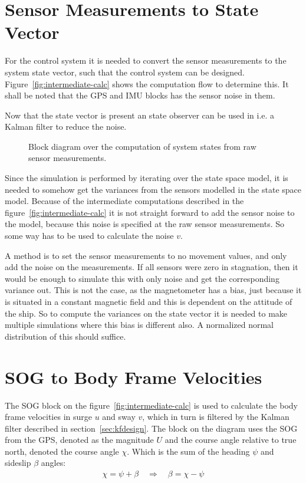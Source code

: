 \section{Sensor Measurements to State Vector}
For the control system it is needed to convert the sensor measurements
to the system state vector, such that the control system can be
designed. Figure~\vref{fig:intermediate-calc} shows the computation
flow to determine this. It shall be noted that the \ac{GPS} and
\ac{IMU} blocks has the sensor noise in them.

Now that the state vector is present an state observer can be used
in i.e. a Kalman filter to reduce the noise.

\begin{figure}
	\centering
	
	\caption{Block diagram over the computation of system states from
	raw sensor measurements.}
	\label{fig:intermediate-calc}
\end{figure}

Since the simulation is performed by iterating over the state space
model, it is needed to somehow get the variances from the sensors
modelled in the state space model. Because of the intermediate
computations described in the figure~\vref{fig:intermediate-calc} it
is not straight forward to add the sensor noise to the model, because
this noise is specified at the raw sensor measurements. So some way
has to be used to calculate the noise $v$.

A method is to set the sensor measurements to no movement values, and
only add the noise on the measurements. If all sensors were zero in
stagnation, then it would be enough to simulate this with only noise and
get the corresponding variance out. This is not the case, as the
magnetometer has a bias, just because it is situated in a constant
magnetic field and this is dependent on the attitude of the ship. So
to compute the variances on the state vector it is needed to make
multiple simulations where this bias is different also. A normalized
normal distribution of this should suffice. 

\section{\acs{SOG} to Body Frame Velocities}
The \acl{SOG} block on the figure~\vref{fig:intermediate-calc} is used to calculate the body frame velocities in surge $u$ and sway $v$, which in turn is filtered by the Kalman filter described in section~\vref{sec:kfdesign}. The block on the diagram uses the \ac{SOG} from the \ac{GPS}, denoted as the magnitude $U$ and the course angle relative to true north, denoted the course angle $\chi$. Which is the sum of the heading $\psi$ and sideslip $\beta$ angles:
\begin{align}
\chi = \psi + \beta \quad \Rightarrow  \quad \beta = \chi - \psi
\label{eq:angles}
\end{align}

